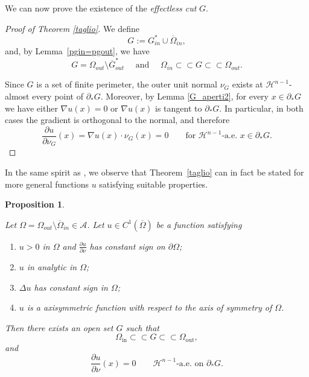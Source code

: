 \documentclass[oneside,a4paper,11pt,notitlepage]{article}
\newcommand{\Simm}{\mathcal A}
\theoremstyle{plain}
\numberwithin{teor}{section}
\numberwithin{equation}{section}
\theoremstyle{definition}
\theoremstyle{plain}
\theoremstyle{plain}
\newtheorem{prop}[prop]{Proposition}
\theoremstyle{plain}
\theoremstyle{plain}
\theoremstyle{definition}
\theoremstyle{definition}
\theoremstyle{plain}
\begin{document}
We can now prove the existence of the {\it effectless cut} $G$.
\begin{proof}[Proof of Theorem \ref{taglio}]

We define
\[
G := G^\ast_{in} \cup \overline{\Omega}_{in},
\]
and, by Lemma~\ref{pgin=pgout}, we have
\[
G = \Omega_{out} \setminus \overline{G}^\ast_{out} \quad \text{ and } \quad \Omega_{in} \subset \subset G \subset \subset \Omega_{out}.
\]


Since $G$ is a set of finite perimeter, the outer unit normal $\nu_G$ exists at $\mathcal{H}^{n-1}$-almost every point of $\partial_\ast G$. Moreover, by Lemma \ref{G_aperti2}, for every $x \in \partial_\ast G$ we have either $\nabla u(x)=0$ or $\nabla u(x)$ is tangent to $\partial_\ast G$. In particular, in both cases the gradient is orthogonal to the normal, and therefore
\[
\frac{\partial u}{\partial \nu_G}(x)
= \nabla u(x)\cdot \nu_G(x)
= 0
\qquad \text{for } \mathcal{H}^{n-1}\text{-a.e. } x \in \partial_\ast G.
\]
\end{proof}
In the same spirit as \cite{Weinberger}, we observe that Theorem~\ref{taglio} can in fact be stated for more general functions $u$ satisfying suitable properties.
\begin{prop}\label{taglio2}

Let $\Omega = \Omega_{out} \setminus \overline{\Omega}_{in} \in \Simm$. Let $u \in C^{1}(\overline{\Omega})$ be a  function satisfying
\begin{enumerate}
    \item[a.] $u>0$ in $\Omega$ and $\frac{\partial u}{\partial \nu}$ has constant sign on $\partial \Omega$;
    \item[b.] $u$ in analytic in $\Omega$; 
    \item[c.]  $\Delta u$ has constant sign in $\Omega$;
    \item[d.] $u$ is a axisymmetric function with respect to the axis of symmetry of $\Omega$. 
\end{enumerate}
 Then there exists an open set $G$ such that
\[
\Omega_{\mathrm{in}} \subset\subset G \subset\subset \Omega_{\mathrm{out}},
\]
and
\[
\frac{\partial u}{\partial \nu}(x) = 0
\qquad \mathcal{H}^{n-1}\text{-a.e.\ on } \partial_\ast G.
\]
\end{prop}
\end{document}
